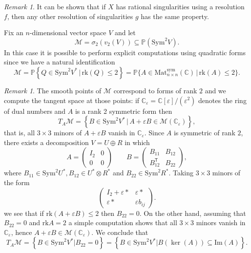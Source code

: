 \documentclass[11pt]{article}
\numberwithin{equation}{section}
\numberwithin{figure}{section}
\theoremstyle{plain}
\theoremstyle{definition}
\theoremstyle{remark}
\newtheorem{rem}[thm]{Remark}
\newcommand{\su}{\subseteq}
\newcommand{\C}{\mathbb{C}}
\renewcommand{\P}{\mathbb{P}}
\newcommand{\Sym}{\mathrm{Sym}}
\begin{document}
\begin{rem}\label{rem:RationalSingularities}
It can be shown that if $X$ has rational singularities using a resolution $f$, then any other resolution of singularities $g$ has the same property. \cite[Proposition 1.2.29]{Wey}
\end{rem}
Fix an $n$-dimensional vector space $V$ and let
\[
\mathcal M = \sigma_2 \left( v_2 \left( V \right) \right) \su
\P\left( \mathrm{Sym}^2 V \right).
\]
In this case it is possible to perform explicit computations using quadratic forms since we have a natural identification 
\[
\mathcal M=\P\left\{Q \in \mathrm{Sym}^2 V^\ast \,\big| \, \mathrm{rk}\left(Q \right)\le 2\right\}=\P\{ A\in\mathrm{Mat}^\mathrm{sym}_{n\times n}\left(\C\right)\,\big| \,\mathrm{rk}\left( A\right)\le2\}.
\]
\begin{rem}
The smooth points of $\mathcal M$ correspond to forms of rank $2$ and we compute the tangent space at those points: if $\C_\varepsilon=\C[\varepsilon]/ \left( \varepsilon^2 \right)$ denotes the ring of dual numbers and $A$ is a rank 2 symmetric form then
\[
T_A\mathcal M = \left\{ B\in\Sym^2 V^\ast\, \big| \, A+\varepsilon B\in \mathcal M\left(  \C_\varepsilon \right) \right\},
\]
that is, all $3\times3$ minors of $A+\varepsilon B$ vanish in $ \C_\varepsilon$. Since $A$ is symmetric of rank $2$, there exists a decomposition $V=U\oplus R$ in which
\[
A = 
\begin{pmatrix}
I_2 & 0\\
0 & 0
\end{pmatrix}
\qquad
B =
\begin{pmatrix}
B_{11} & B_{12}\\
B_{12}^{\mathsf T} & B_{22}
\end{pmatrix},
\]
where
$B_{11}\in\Sym^2 U^\ast, B_{12}\in U^\ast\otimes R^\ast$ and $B_{22}\in\Sym^2 R^\ast$.
Taking $3\times 3$ minors of the form 
\[
\begin{pmatrix}
I_2+\varepsilon\ast & \varepsilon\ast\\
\varepsilon\ast & \varepsilon b_{ij}
\end{pmatrix}.
\]
we see that if $\mathrm{rk}\left( A+\varepsilon B\right) \le2$ then $B_{22}=0$. On the other hand, assuming that $B_{22}=0$ and $\mathrm{rk} A=2$ a simple computation shows that
all $3\times 3$ minors vanish in
$ \C_\varepsilon$, hence
$A+\varepsilon B\in\mathcal M\left(  \C_\varepsilon\right)$.
We conclude that
\begin{equation}\label{eq:TangentDeterminantal}
T_A\mathcal M = \left\{
B\in\Sym^2 V^\ast \big| 
B_{22}=0 \right\}
=
\left\{ B\in\Sym^2 V^\ast \big| B\left( \ker\left( A \right) \right)
\subseteq \mathrm{Im}\left( A \right)
\right\}.
\end{equation}
\end{rem}
\end{document}
